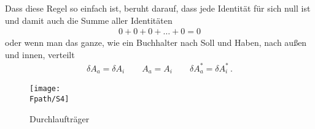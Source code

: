 Dass diese Regel so einfach ist, beruht darauf, dass jede Identit\"{a}t f\"{u}r sich null ist und damit auch die Summe aller Identit\"{a}ten
\begin{align}
0 + 0 + 0 + \ldots + 0 = 0
\end{align}
oder wenn man das ganze, wie ein Buchhalter nach Soll und Haben, nach au{\ss}en und innen, verteilt
\begin{align}
\delta A_a = \delta A_i \qquad A_a = A_i \qquad \delta A_a^* = \delta A_i^*\,.
\end{align}




\begin{figure}[tbp]
\centering
\if {} \sidecaption \fi
\texttt{[image: \\Fpath/S4]}
\caption{Durchlauftr\"{a}ger} \label{S4}
%
\end{figure}%

